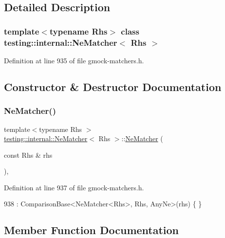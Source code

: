 \subsection{Detailed Description}
\subsubsection*{template$<$typename Rhs$>$\newline
class testing\+::internal\+::\+Ne\+Matcher$<$ Rhs $>$}



Definition at line 935 of file gmock-\/matchers.\+h.



\subsection{Constructor \& Destructor Documentation}
\mbox{\label{classtesting_1_1internal_1_1NeMatcher_a64842882811cc96624c87119c51edd3e}} 
\subsubsection{\texorpdfstring{Ne\+Matcher()}{NeMatcher()}}
{\footnotesize\ttfamily template$<$typename Rhs $>$ \\
\hyperlink{classtesting_1_1internal_1_1NeMatcher}{testing\+::internal\+::\+Ne\+Matcher}$<$ Rhs $>$\+::\hyperlink{classtesting_1_1internal_1_1NeMatcher}{Ne\+Matcher} (\begin{DoxyParamCaption}\item[{const Rhs \&}]{rhs }\end{DoxyParamCaption})\hspace{0.3cm}{\ttfamily [inline]}, {\ttfamily [explicit]}}



Definition at line 937 of file gmock-\/matchers.\+h.


\begin{DoxyCode}
938       : ComparisonBase<NeMatcher<Rhs>, Rhs, AnyNe>(rhs) \{ \}
\end{DoxyCode}


\subsection{Member Function Documentation}
\mbox{\label{classtesting_1_1internal_1_1NeMatcher_a2ec33febe5471f9d435b4dc9f5cda564}} 

